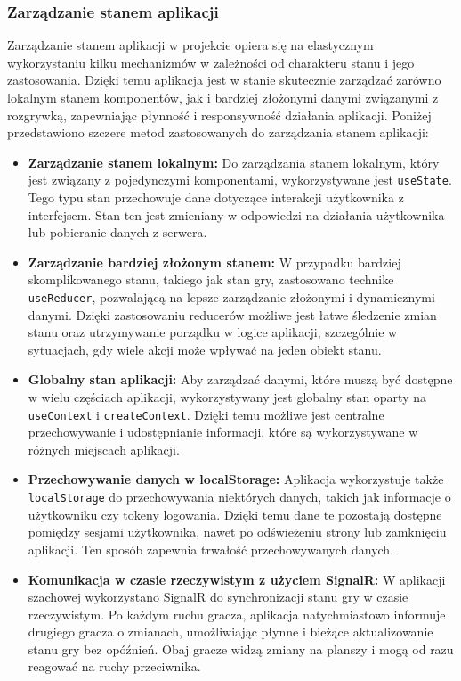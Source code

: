 \documentclass[twoside]{projektInzynierskiMS1}
\begin{document}
\newpage

\subsubsection{Zarządzanie stanem aplikacji}

\noindent
Zarządzanie stanem aplikacji w projekcie opiera się na elastycznym wykorzystaniu kilku mechanizmów w zależności od charakteru stanu i jego zastosowania. Dzięki temu aplikacja jest w stanie skutecznie zarządzać zarówno lokalnym stanem komponentów, jak i bardziej złożonymi danymi związanymi z rozgrywką, zapewniając płynność i responsywność działania aplikacji. Poniżej przedstawiono szczere metod zastosowanych do zarządzania stanem aplikacji:

\begin{itemize}
    \item \textbf{Zarządzanie stanem lokalnym:} Do zarządzania stanem lokalnym, który jest związany z pojedynczymi komponentami, wykorzystywane jest \texttt{useState}. Tego typu stan przechowuje dane dotyczące interakcji użytkownika z interfejsem. Stan ten jest zmieniany w odpowiedzi na działania użytkownika lub pobieranie danych z serwera.

    \item \textbf{Zarządzanie bardziej złożonym stanem:} W przypadku bardziej skomplikowanego stanu, takiego jak stan gry, zastosowano technike \texttt{useReducer}, pozwalającą na lepsze zarządzanie złożonymi i dynamicznymi danymi. Dzięki zastosowaniu reducerów możliwe jest łatwe śledzenie zmian stanu oraz utrzymywanie porządku w logice aplikacji, szczególnie w sytuacjach, gdy wiele akcji może wpływać na jeden obiekt stanu.

    \item \textbf{Globalny stan aplikacji:} Aby zarządzać danymi, które muszą być dostępne w wielu częściach aplikacji, wykorzystywany jest globalny stan oparty na \texttt{useContext} i \texttt{createContext}. Dzięki temu możliwe jest centralne przechowywanie i udostępnianie informacji, które są wykorzystywane w różnych miejscach aplikacji.

    \item \textbf{Przechowywanie danych w localStorage:} Aplikacja wykorzystuje także \texttt{localStorage} do przechowywania niektórych danych, takich jak informacje o użytkowniku czy tokeny logowania. Dzięki temu dane te pozostają dostępne pomiędzy sesjami użytkownika, nawet po odświeżeniu strony lub zamknięciu aplikacji. Ten sposób zapewnia trwałość przechowywanych danych.

    \item \textbf{Komunikacja w czasie rzeczywistym z użyciem SignalR:} W aplikacji szachowej wykorzystano SignalR do synchronizacji stanu gry w czasie rzeczywistym. Po każdym ruchu gracza, aplikacja natychmiastowo informuje drugiego gracza o zmianach, umożliwiając płynne i bieżące aktualizowanie stanu gry bez opóźnień. Obaj gracze widzą zmiany na planszy i mogą od razu reagować na ruchy przeciwnika.

\end{itemize}
\end{document}
